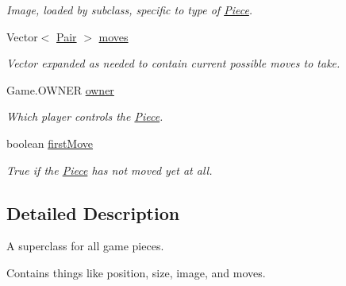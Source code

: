 \begin{DoxyCompactItemize}
\begin{DoxyCompactList}\small\item\em Image, loaded by subclass, specific to type of \hyperlink{classapplication_1_1_piece}{Piece}. \end{DoxyCompactList}\item 
\hypertarget{classapplication_1_1_piece_a9e704a1ebc750f4a5f1c640f1cc927f4}{Vector$<$ \hyperlink{classapplication_1_1_pair}{Pair} $>$ \hyperlink{classapplication_1_1_piece_a9e704a1ebc750f4a5f1c640f1cc927f4}{moves}}\label{classapplication_1_1_piece_a9e704a1ebc750f4a5f1c640f1cc927f4}

\begin{DoxyCompactList}\small\item\em Vector expanded as needed to contain current possible moves to take. \end{DoxyCompactList}\item 
\hypertarget{classapplication_1_1_piece_a724f116bd99a66a6f6bcc8b7b35de131}{Game.\+O\+W\+N\+E\+R \hyperlink{classapplication_1_1_piece_a724f116bd99a66a6f6bcc8b7b35de131}{owner}}\label{classapplication_1_1_piece_a724f116bd99a66a6f6bcc8b7b35de131}

\begin{DoxyCompactList}\small\item\em Which player controls the \hyperlink{classapplication_1_1_piece}{Piece}. \end{DoxyCompactList}\item 
\hypertarget{classapplication_1_1_piece_a8610c3152130255360304aabb534e7cb}{boolean \hyperlink{classapplication_1_1_piece_a8610c3152130255360304aabb534e7cb}{first\+Move}}\label{classapplication_1_1_piece_a8610c3152130255360304aabb534e7cb}

\begin{DoxyCompactList}\small\item\em True if the \hyperlink{classapplication_1_1_piece}{Piece} has not moved yet at all. \end{DoxyCompactList}\end{DoxyCompactItemize}


\subsection{Detailed Description}
A superclass for all game pieces. 

Contains things like position, size, image, and moves. 

